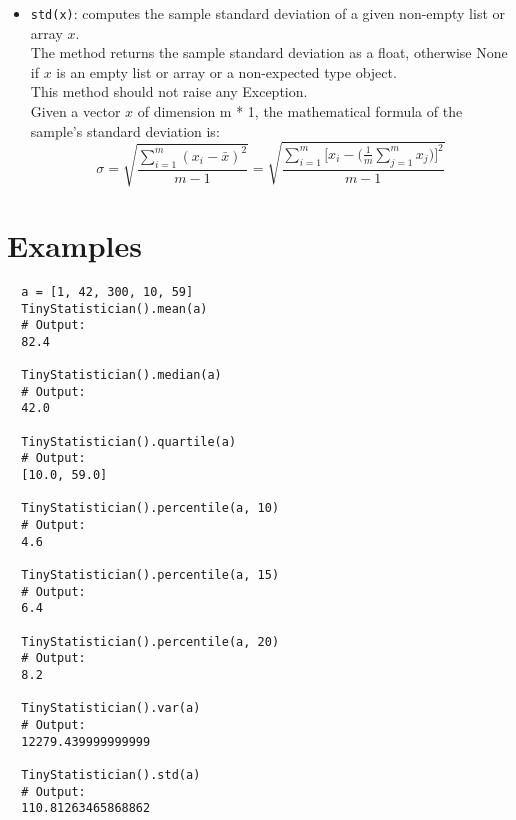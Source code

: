 \begin{itemize}
  \item \texttt{std(x)}: computes the sample standard deviation of a given non-empty list or array $x$.\\
        The method returns the sample standard deviation as a float,
        otherwise None if $x$ is an empty list or array or a non-expected type object.\\
        This method should not raise any Exception.\\
        \newline
        Given a vector $x$ of dimension m * 1, the mathematical formula of the sample's standard deviation is:
        $$
        \sigma = \sqrt{\frac{\sum_{i = 1}^{m}{(x_i - \bar{x})^2}}{m - 1}} = \sqrt{\frac{\sum_{i = 1}^{m}{[x_i - (\frac{1}{m}\sum_{j = 1}^{m}{x_j}})]^2}{m - 1}}
        $$
\end{itemize}

\section*{Examples}

\begin{verbatim}  
  a = [1, 42, 300, 10, 59]
  TinyStatistician().mean(a)
  # Output:
  82.4

  TinyStatistician().median(a)
  # Output:
  42.0

  TinyStatistician().quartile(a)
  # Output:
  [10.0, 59.0]

  TinyStatistician().percentile(a, 10)
  # Output:
  4.6

  TinyStatistician().percentile(a, 15)
  # Output:
  6.4

  TinyStatistician().percentile(a, 20)
  # Output:
  8.2

  TinyStatistician().var(a)
  # Output:
  12279.439999999999

  TinyStatistician().std(a)
  # Output:
  110.81263465868862
\end{verbatim}

